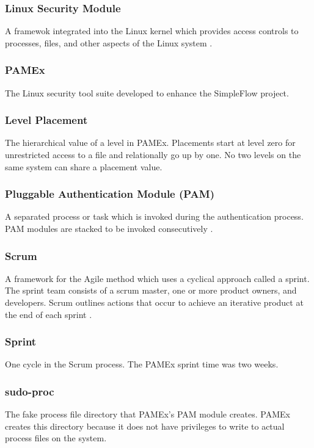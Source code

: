 \subsubsection*{Linux Security Module}

A framewok integrated into the Linux kernel which provides access controls to processes, files, and other aspects of the Linux system \cite{kerneldocs}.

\subsubsection*{PAMEx}

The Linux security tool suite developed to enhance the SimpleFlow project. 

\subsubsection*{Level Placement}

The hierarchical value of a level in PAMEx. Placements start at level zero for unrestricted access to a file and relationally go up by one. No two levels on the same system can share a placement value. 

\subsubsection*{Pluggable Authentication Module (PAM)}

A separated process or task which is invoked during the authentication process. PAM modules are stacked to be invoked consecutively \cite{lauber}.

\subsubsection*{Scrum}

A framework for the Agile method which uses a cyclical approach called a sprint. The sprint team consists of a scrum master, one or more product owners, and developers. Scrum outlines actions that occur to achieve an iterative product at the end of each sprint \cite{scrumorg}.

\subsubsection*{Sprint}

One cycle in the Scrum process. The PAMEx sprint time was two weeks.

\subsubsection*{sudo-proc}
The fake process file directory that PAMEx's PAM module creates. PAMEx creates this directory because it does not have privileges to write to actual process files on the system.

